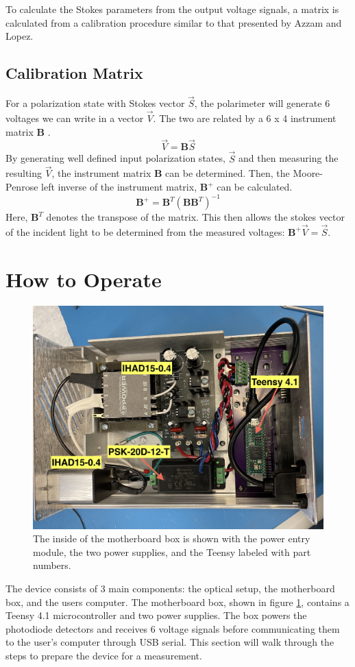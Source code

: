 \documentclass{article}
\begin{document}
To calculate the Stokes parameters from the output voltage signals, a matrix is calculated from a calibration procedure similar to that presented by Azzam and Lopez\cite{Azzam89}. 

\subsection{Calibration Matrix}
For a polarization state with Stokes vector $\vec{S}$, the polarimeter will generate 6 voltages we can write in a vector $\vec{V}$. The two are related by a 6 x 4 instrument matrix $\textbf{B}$ .
\begin{equation}
    \vec{V} = \textbf{B}\vec{S}
    \label{Calibration eq}
\end{equation} 
By generating well defined input polarization states, $\vec{S}$ and then measuring the resulting $\vec{V}$, the instrument matrix $\textbf{B}$ can be determined. Then, the Moore-Penrose left inverse of the instrument matrix, $\textbf{B}^{+}$ can be calculated.
\begin{equation}
    \textbf{B}^{+} = \textbf{B}^{T}(\textbf{B}\textbf{B}^{T})^{-1}
    \label{MP_inverse}
\end{equation}
Here, $\textbf{B}^{T}$ denotes the transpose of the matrix. This then allows the stokes vector of the incident light to be determined from the measured voltages: $\textbf{B}^{+}\vec{V}=\vec{S}$.


\section{How to Operate}
\begin{figure}[h]
    \centering
    \includegraphics[width=.8\textwidth]{refs_figures/motherboard_box.jpg}
    \caption{The inside of the motherboard box is shown with the power entry module, the two power supplies, and the Teensy labeled with part numbers.}
    \label{motherboard_box}
\end{figure}
The device consists of 3 main components: the optical setup, the motherboard box, and the users computer. The motherboard box, shown in figure \ref{motherboard_box}, contains a Teensy 4.1 microcontroller and two power supplies. The box powers the photodiode detectors and receives 6 voltage signals before communicating them to the user's computer through USB serial. This section will walk through the steps to prepare the device for a measurement. 
\end{document}

